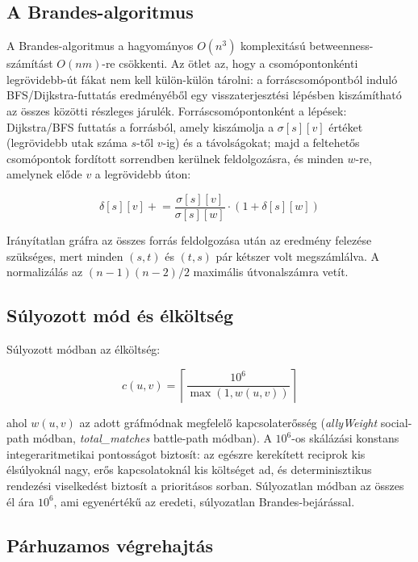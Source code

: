 \subsection{A Brandes-algoritmus}

A Brandes-algoritmus \cite{brandes2001} a hagyományos $O(n^3)$ komplexitású betweenness-számítást $O(nm)$-re csökkenti. Az ötlet az, hogy a csomópontonkénti legrövidebb-út fákat nem kell külön-külön tárolni: a forráscsomópontból induló BFS/Dijkstra-futtatás eredményéből egy visszaterjesztési lépésben kiszámítható az összes közötti részleges járulék. Forráscsomópontonként a lépések: Dijkstra/BFS futtatás a forrásból, amely kiszámolja a $\sigma[s][v]$ értéket (legrövidebb utak száma $s$-től $v$-ig) és a távolságokat; majd a feltehetős csomópontok fordított sorrendben kerülnek feldolgozásra, és minden $w$-re, amelynek előde $v$ a legrövidebb úton:

\begin{equation}
\delta[s][v] \mathrel{+}= \frac{\sigma[s][v]}{\sigma[s][w]} \cdot (1 + \delta[s][w])
\end{equation}

Irányítatlan gráfra az összes forrás feldolgozása után az eredmény felezése szükséges, mert minden $(s, t)$ és $(t, s)$ pár kétszer volt megszámlálva. A normalizálás az $(n-1)(n-2)/2$ maximális útvonalszámra vetít.

\subsection{Súlyozott mód és élköltség}

Súlyozott módban az élköltség:

\begin{equation}
c(u,v) = \left\lceil \frac{10^6}{\max(1, w(u,v))} \right\rceil
\end{equation}

ahol $w(u,v)$ az adott gráfmódnak megfelelő kapcsolaterősség (\textit{allyWeight} social-path módban, \textit{total\_matches} battle-path módban). A $10^6$-os skálázási konstans integeraritmetikai pontosságot biztosít: az egészre kerekített reciprok kis élsúlyoknál nagy, erős kapcsolatoknál kis költséget ad, és determinisztikus rendezési viselkedést biztosít a prioritásos sorban. Súlyozatlan módban az összes él ára $10^6$, ami egyenértékű az eredeti, súlyozatlan Brandes-bejárással.

\subsection{Párhuzamos végrehajtás}

